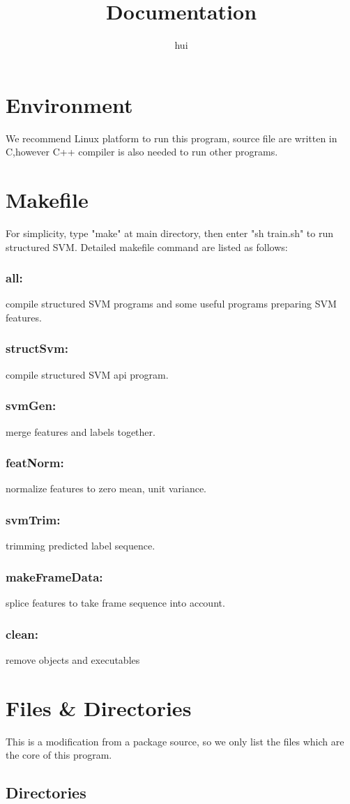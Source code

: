 \documentclass[10pt,a4paper]{article}
\author{hui}
\title{Documentation}
\begin{document}
\section{Environment}
We recommend Linux platform to run this program, source file are written in C,however C++ compiler is also needed to run other programs.
\section{Makefile}
For simplicity, type "make" at main directory, then enter "sh train.sh" to run structured SVM.
Detailed makefile command are listed as follows:
\subsubsection*{all:}
 compile structured SVM programs and some useful programs preparing SVM features.
\subsubsection*{structSvm:}
 compile structured SVM api program.
\subsubsection*{svmGen:}
 merge features and labels together. 
\subsubsection*{featNorm:}
 normalize features to zero mean, unit variance.
\subsubsection*{svmTrim:}
 trimming predicted label sequence.
\subsubsection*{makeFrameData:}
 splice features to take frame sequence into account.
\subsubsection*{clean:}
 remove objects and executables
\section{Files \& Directories}
This is a modification from a package source, so we only list the files which are the core of this program.  
\subsection{Directories}
\end{document}

